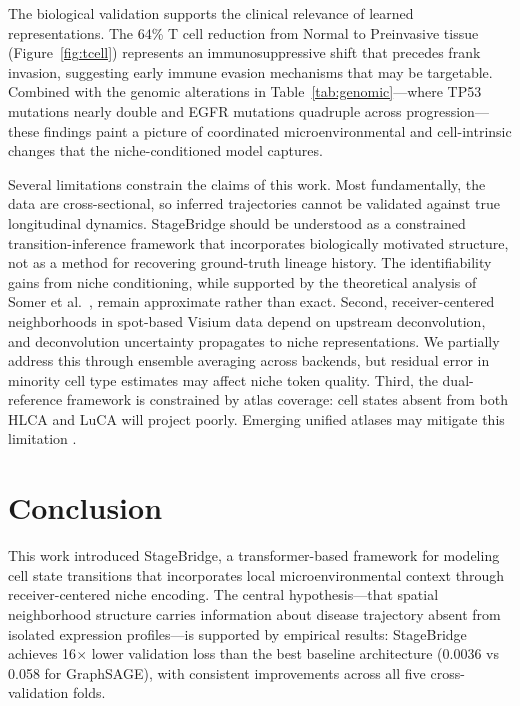 \documentclass[conference]{IEEEtran}
\begin{document}
The biological validation supports the clinical relevance of learned representations. The 64\% T cell reduction from Normal to Preinvasive tissue (Figure~\ref{fig:tcell}) represents an immunosuppressive shift that precedes frank invasion, suggesting early immune evasion mechanisms that may be targetable. Combined with the genomic alterations in Table~\ref{tab:genomic}---where TP53 mutations nearly double and EGFR mutations quadruple across progression---these findings paint a picture of coordinated microenvironmental and cell-intrinsic changes that the niche-conditioned model captures.

Several limitations constrain the claims of this work. Most fundamentally, the data are cross-sectional, so inferred trajectories cannot be validated against true longitudinal dynamics. StageBridge should be understood as a constrained transition-inference framework that incorporates biologically motivated structure, not as a method for recovering ground-truth lineage history. The identifiability gains from niche conditioning, while supported by the theoretical analysis of Somer et al.\ \cite{Somer2026-ma}, remain approximate rather than exact. Second, receiver-centered neighborhoods in spot-based Visium data depend on upstream deconvolution, and deconvolution uncertainty propagates to niche representations. We partially address this through ensemble averaging across backends, but residual error in minority cell type estimates may affect niche token quality. Third, the dual-reference framework is constrained by atlas coverage: cell states absent from both HLCA and LuCA will project poorly. Emerging unified atlases may mitigate this limitation \cite{Cultrera-di-Montesano2026-vq}.

\section{Conclusion}

This work introduced StageBridge, a transformer-based framework for modeling cell state transitions that incorporates local microenvironmental context through receiver-centered niche encoding. The central hypothesis---that spatial neighborhood structure carries information about disease trajectory absent from isolated expression profiles---is supported by empirical results: StageBridge achieves 16$\times$ lower validation loss than the best baseline architecture (0.0036 vs 0.058 for GraphSAGE), with consistent improvements across all five cross-validation folds.
\end{document}
